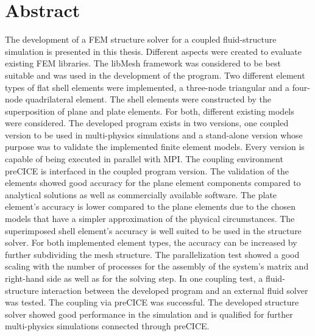 \section*{Abstract}

The development of a FEM structure solver for a coupled fluid-structure simulation is presented in this thesis. Different aspects were created to evaluate existing FEM libraries. The libMesh framework was considered to be best suitable and was used in the development of the program. Two different element types of flat shell elements were implemented, a three-node triangular and a four-node quadrilateral element. The shell elements were constructed by the superposition of plane and plate elements. For both, different existing models were considered. The developed program exists in two versions, one coupled version to be used in multi-physics simulations and a stand-alone version whose purpose was to validate the implemented finite element models. Every version is capable of being executed in parallel with MPI. The coupling environment preCICE is interfaced in the coupled program version. The validation of the elements showed good accuracy for the plane element components compared to analytical solutions as well as commercially available software. The plate element's accuracy is lower compared to the plane elements due to the chosen models that have a simpler approximation of the physical circumstances. The superimposed shell element's accuracy is well suited to be used in the structure solver. For both implemented element types, the accuracy can be increased by further subdividing the mesh structure. The parallelization test showed a good scaling with the number of processes for the assembly of the system's matrix and right-hand side as well as for the solving step. In one coupling test, a fluid-structure interaction between the developed program and an external fluid solver was tested. The coupling via preCICE was successful. The developed structure solver showed good performance in the simulation and is qualified for further multi-physics simulations connected through preCICE.

